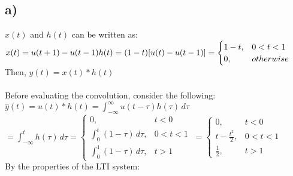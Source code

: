 \documentclass[12pt]{article}
\begin{document}
    \subsection*{a)}
	\(x(t)\) and \(h(t)\) can be written as: \\
    \begin{math}
      x(t) = u(t+1)-u(t-1) \\
      h(t) =  (1-t)[u(t)-u(t-1)] = \begin{cases}
      1-t,& 0<t<1 \\
      0,& otherwise
    \end{cases} \end{math}\\
      Then, \begin{math}y(t) = x(t)*h(t) \end{math}\\ \\
      Before evaluating the convolution, consider the following: \\
     \begin{math} \hat{y}(t) = u(t)*h(t) = \int_{-\infty}^{\infty} u(t-\tau)h(\tau) \,d\tau \end{math} \\
     \begin{math}  = \int_{-\infty}^{t} h(\tau) \,d\tau = \begin{cases}
      0,& t < 0\\
      \int_{0}^{t} (1-\tau) \,d\tau,& 0 < t < 1\\
     \int_{0}^{1} (1-\tau) \,d\tau,& t > 1
    \end{cases} \ =   \begin{cases}
      0,& t < 0\\
      t - \frac{t^{2}}{2} ,& 0 < t < 1\\
     \frac{1}{2},& t > 1
    \end{cases}  \end{math} \\
    By the properties of the LTI system: \\ 
\end{document}
